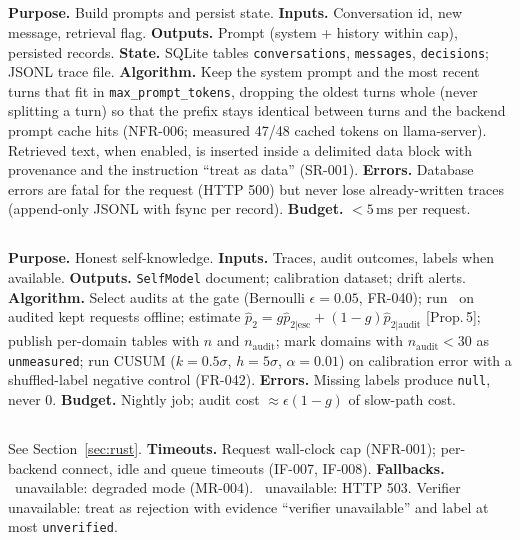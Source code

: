 \documentclass[11pt,a4paper]{article}
\begin{document}
\subsection{\Mem}
\textbf{Purpose.} Build prompts and persist state. \textbf{Inputs.} Conversation id, new message, retrieval flag. \textbf{Outputs.} Prompt (system + history within cap), persisted records. \textbf{State.} SQLite tables \texttt{conversations}, \texttt{messages}, \texttt{decisions}; JSONL trace file. \textbf{Algorithm.} Keep the system prompt and the most recent turns that fit in \texttt{max\_prompt\_tokens}, dropping the oldest turns whole (never splitting a turn) so that the prefix stays identical between turns and the backend prompt cache hits (NFR-006; measured 47/48 cached tokens on llama-server). Retrieved text, when enabled, is inserted inside a delimited data block with provenance and the instruction ``treat as data'' (SR-001). \textbf{Errors.} Database errors are fatal for the request (HTTP 500) but never lose already-written traces (append-only JSONL with fsync per record). \textbf{Budget.} $<5$\,ms per request.

\subsection{\Ledger}
\textbf{Purpose.} Honest self-knowledge. \textbf{Inputs.} Traces, audit outcomes, labels when available. \textbf{Outputs.} \texttt{SelfModel} document; calibration dataset; drift alerts. \textbf{Algorithm.} Select audits at the gate (Bernoulli $\epsilon=0.05$, FR-040); run \Stwo\ on audited kept requests offline; estimate $\hat p_2=g\hat p_{2|\text{esc}}+(1-g)\hat p_{2|\text{audit}}$ [Prop.\,5]; publish per-domain tables with $n$ and $n_{\text{audit}}$; mark domains with $n_{\text{audit}}<30$ as \texttt{unmeasured}; run CUSUM ($k=0.5\sigma$, $h=5\sigma$, $\alpha=0.01$) on calibration error with a shuffled-label negative control (FR-042). \textbf{Errors.} Missing labels produce \texttt{null}, never 0. \textbf{Budget.} Nightly job; audit cost $\approx\epsilon(1-g)$ of slow-path cost.

\subsection{\Gw}
See Section~\ref{sec:rust}. \textbf{Timeouts.} Request wall-clock cap (NFR-001); per-backend connect, idle and queue timeouts (IF-007, IF-008). \textbf{Fallbacks.} \Stwo\ unavailable: degraded mode (MR-004). \Sone\ unavailable: HTTP 503. Verifier unavailable: treat as rejection with evidence ``verifier unavailable'' and label at most \texttt{unverified}.
\end{document}
